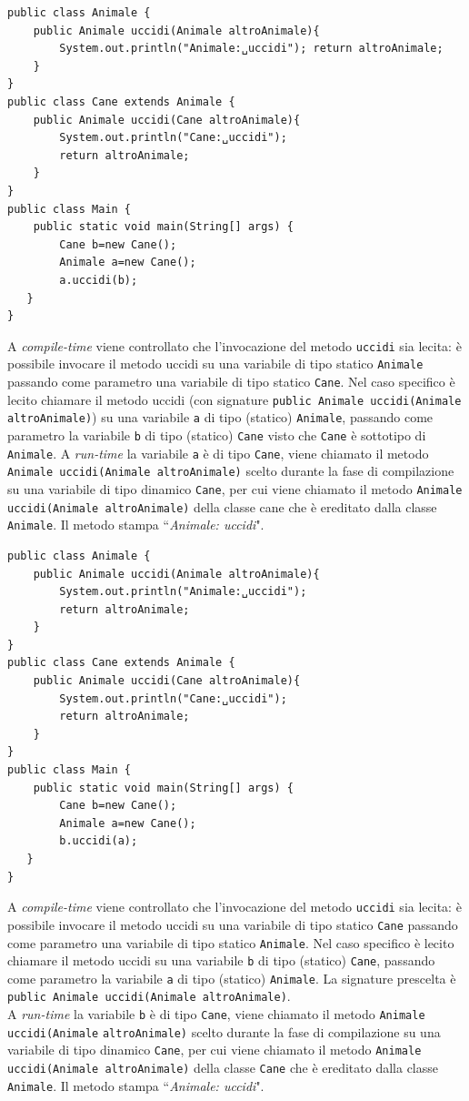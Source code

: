 \documentclass{article}
\begin{document}
\begin{lstlisting}
public class Animale {
    public Animale uccidi(Animale altroAnimale){
        System.out.println("Animale:␣uccidi"); return altroAnimale;
    }
}
public class Cane extends Animale {
    public Animale uccidi(Cane altroAnimale){ 
        System.out.println("Cane:␣uccidi"); 
        return altroAnimale;
    }
}
public class Main {
    public static void main(String[] args) { 
        Cane b=new Cane();
        Animale a=new Cane();
        a.uccidi(b);
   } 
}
\end{lstlisting}
A \emph{compile-time} viene controllato che l'invocazione del metodo \texttt{uccidi} sia lecita: \`e possibile invocare il metodo uccidi su una variabile di tipo statico \texttt{Animale} passando come parametro una variabile di tipo statico \texttt{Cane}. Nel caso specifico \`e lecito chiamare il metodo uccidi (con signature \texttt{public Animale uccidi(Animale altroAnimale)}) su una variabile \texttt{a} di tipo (statico) \texttt{Animale}, passando come parametro la variabile \texttt{b} di tipo (statico) \texttt{Cane} visto che \texttt{Cane} \`e sottotipo di \texttt{Animale}. A \emph{run-time} la variabile \texttt{a} \`e di tipo \texttt{Cane}, viene chiamato il metodo \texttt{Animale uccidi(Animale altroAnimale)} scelto durante la fase di compilazione su una variabile di tipo dinamico \texttt{Cane}, per cui viene chiamato il metodo \texttt{Animale uccidi(Animale altroAnimale)} della classe cane che \`e ereditato dalla classe \texttt{Animale}. Il metodo stampa ``\textit{Animale: uccidi}".

\begin{lstlisting}
public class Animale {
    public Animale uccidi(Animale altroAnimale){
        System.out.println("Animale:␣uccidi");
        return altroAnimale; 
    }
}
public class Cane extends Animale { 
    public Animale uccidi(Cane altroAnimale){
        System.out.println("Cane:␣uccidi");
        return altroAnimale; 
    }
}
public class Main {
    public static void main(String[] args) {
        Cane b=new Cane(); 
        Animale a=new Cane(); 
        b.uccidi(a);
   } 
}
\end{lstlisting}
A \emph{compile-time} viene controllato che l'invocazione del metodo \texttt{uccidi} sia lecita: \`e possibile invocare il metodo uccidi su una variabile di tipo statico \texttt{Cane} passando come parametro una variabile di tipo statico \texttt{Animale}. Nel caso specifico \`e lecito chiamare il metodo uccidi su una variabile \texttt{b} di tipo (statico) \texttt{Cane}, passando come parametro la variabile \texttt{a} di tipo (statico) \texttt{Animale}.
La signature prescelta \`e \texttt{public Animale uccidi(Animale altroAnimale)}. \\
A \emph{run-time} la variabile \texttt{b} \`e di tipo \texttt{Cane}, viene chiamato il metodo \texttt{Animale uccidi(Animale} \texttt{altroAnimale)} scelto durante la fase di compilazione su una variabile di tipo dinamico \texttt{Cane}, per cui viene chiamato il metodo \texttt{Animale uccidi(Animale altroAnimale)} della classe \texttt{Cane} che \`e ereditato dalla classe \texttt{Animale}. Il metodo stampa ``\textit{Animale: uccidi}".
\end{document}

